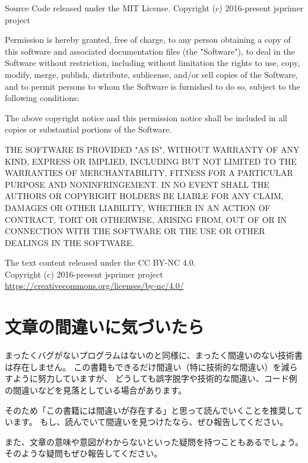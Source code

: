 Source Code released under the MIT License.
Copyright (c) 2016-present jsprimer project

Permission is hereby granted, free of charge, to any person obtaining a copy
of this software and associated documentation files (the "Software"), to deal
in the Software without restriction, including without limitation the rights
to use, copy, modify, merge, publish, distribute, sublicense, and/or sell
copies of the Software, and to permit persons to whom the Software is
furnished to do so, subject to the following conditions:

The above copyright notice and this permission notice shall be included in all
copies or substantial portions of the Software.

THE SOFTWARE IS PROVIDED "AS IS", WITHOUT WARRANTY OF ANY KIND, EXPRESS OR
IMPLIED, INCLUDING BUT NOT LIMITED TO THE WARRANTIES OF MERCHANTABILITY,
FITNESS FOR A PARTICULAR PURPOSE AND NONINFRINGEMENT. IN NO EVENT SHALL THE
AUTHORS OR COPYRIGHT HOLDERS BE LIABLE FOR ANY CLAIM, DAMAGES OR OTHER
LIABILITY, WHETHER IN AN ACTION OF CONTRACT, TORT OR OTHERWISE, ARISING FROM,
OUT OF OR IN CONNECTION WITH THE SOFTWARE OR THE USE OR OTHER DEALINGS IN THE
SOFTWARE.

\noindent\hrulefill\hspace*{65mm}

\noindent The text content released under the CC BY-NC 4.0.\\
Copyright (c) 2016-present jsprimer project\\
\url{https://creativecommons.org/licenses/by-nc/4.0/}

\hypertarget{how-to-report-mistake}{%
\section*{文章の間違いに気づいたら}\label{how-to-report-mistake}}

まったくバグがないプログラムはないのと同様に、まったく間違いのない技術書は存在しません。
この書籍もできるだけ間違い（特に技術的な間違い）を減らすように努力していますが、
どうしても誤字脱字や技術的な間違い、コード例の間違いなどを見落としている場合があります。

そのため「この書籍には間違いが存在する」と思って読んでいくことを推奨しています。
もし、読んでいて間違いを見つけたなら、ぜひ報告してください。

また、文章の意味や意図がわからないといった疑問を持つこともあるでしょう。
そのような疑問もぜひ報告してください。

